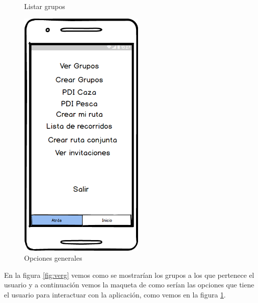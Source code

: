 \begin{figure}[H]
\begin{minipage}[b]{0.5\linewidth}
\caption{Listar grupos}
\label{fig:verg}
\end{minipage}
\hspace{0.5cm} %
\begin{minipage}[b]{0.5\linewidth}
\centering
\includegraphics[width=6cm]{maqueta/opciones.png}
 
\caption{Opciones generales}
\label{fig:opc}
\end{minipage}
\end{figure}
	

En la figura \ref{fig:verg} vemos como se mostrarían los grupos a los que pertenece el usuario y a continuación vemos la maqueta de como serían las opciones que tiene el usuario para interactuar con la aplicación, como vemos en la figura  \ref{fig:opc}.













